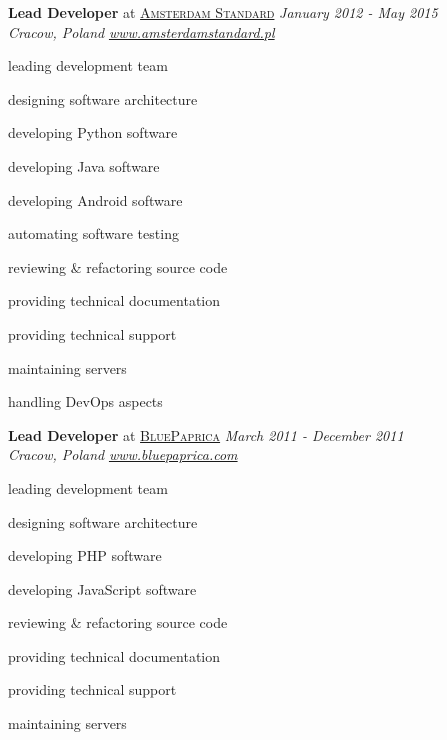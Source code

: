 \documentclass[10pt]{article}
\newenvironment{innerlist}[1][\enskip\textbullet]%
        {\begin{compactitem}[#1]}{\end{compactitem}}
\begin{document}
\textbf{Lead Developer} at \href{http://amsterdamstandard.pl/}{\textsc{Amsterdam Standard}} 
\hfill \textit{January 2012 - May 2015} \\
\textit{Cracow, Poland}
 \hfill \href{http://amsterdamstandard.pl/}{\textit{www.amsterdamstandard.pl}} 
 \vspace{0.1in}
\begin{innerlist}
\item leading development team
\item designing software architecture
\item developing Python software
\item developing Java software
\item developing Android software
\item automating software testing
\item reviewing \& refactoring source code
\item providing technical documentation 
\item providing technical support
\item maintaining servers
\item handling DevOps aspects
\end{innerlist}

\pagebreak

\textbf{Lead Developer} at \href{http://www.bluepaprica.com/}{\textsc{BluePaprica}} 
\hfill \textit{March 2011 - December 2011} \\
\textit{Cracow, Poland} 
\hfill \href{http://www.bluepaprica.com/}{\textit{www.bluepaprica.com}} 
\vspace{0.1in}
\begin{innerlist}
\item leading development team
\item designing software architecture
\item developing PHP software
\item developing JavaScript software
\item reviewing \& refactoring source code
\item providing technical documentation 
\item providing technical support
\item maintaining servers
\end{innerlist}

\vspace{0.30in}
\end{document}
